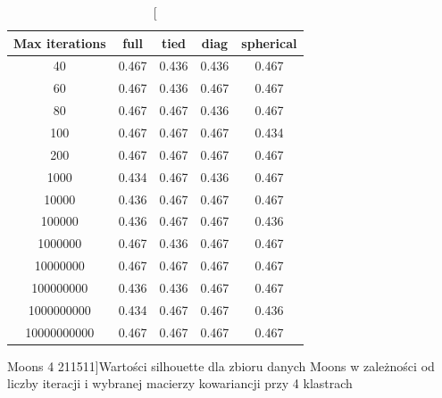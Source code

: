\documentclass{classrep}
\begin{document}
{{            \begin{table}[]
                \begin{minipage}{1\textwidth}
                \centering
                \begin{tabular}{|c|c|c|c|c|}
                \hline
                Max iterations & full & tied & diag & spherical \\ \hline
                40 & 0.467 & 0.436 & 0.436 & 0.467 \\ \hline
                60 & 0.467 & 0.436 & 0.467 & 0.467 \\ \hline
                80 & 0.467 & 0.467 & 0.436 & 0.467 \\ \hline
                100 & 0.467 & 0.467 & 0.467 & 0.434 \\ \hline
                200 & 0.467 & 0.467 & 0.467 & 0.467 \\ \hline
                1000 & 0.434 & 0.467 & 0.436 & 0.467 \\ \hline
                10000 & 0.436 & 0.467 & 0.467 & 0.467 \\ \hline
                100000 & 0.436 & 0.467 & 0.467 & 0.436 \\ \hline
                1000000 & 0.467 & 0.436 & 0.467 & 0.467 \\ \hline
                10000000 & 0.467 & 0.467 & 0.467 & 0.467 \\ \hline
                100000000 & 0.436 & 0.436 & 0.467 & 0.467 \\ \hline
                1000000000 & 0.434 & 0.467 & 0.467 & 0.436 \\ \hline
                10000000000 & 0.467 & 0.467 & 0.467 & 0.467 \\ \hline
                \end{tabular}
                \caption
                [Moons 4 211511]{Wartości silhouette dla zbioru danych Moons w
                zależności od liczby iteracji i wybranej macierzy kowariancji przy 4
                klastrach}
                \label{Moons_4_211511}
                \end{minipage}
                \hfill


\end{table}}}
\end{document}
